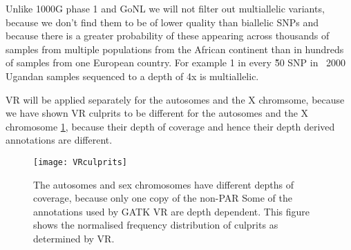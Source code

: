 

Unlike 1000G phase 1 and GoNL we will not filter out multiallelic variants, because we don't find them to be of lower quality than biallelic SNPs and because there is a greater probability of these appearing across thousands of samples from multiple populations from the African continent than in hundreds of samples from one European country. For example 1 in every \~50 SNP in ~2000 Ugandan samples sequenced to a depth of 4x is multiallelic.

\gls{VR} will be applied separately for the autosomes and the X chromsome, because we have shown \gls{VR} culprits to be different for the autosomes and the X chromosome \ref{fig:VRculprits}, because their depth of coverage and hence their depth derived annotations are different.

\begin{figure}[!htbp]
\centering
\texttt{[image: VRculprits]}
\caption{The autosomes and sex chromosomes have different depths of coverage, because only one copy of the non-\gls{PAR} Some of the annotations used by \gls{GATK} \gls{VR} are depth dependent. This figure shows the normalised frequency distribution of culprits as determined by \gls{VR}.}
\label{fig:VRculprits}
\end{figure}

